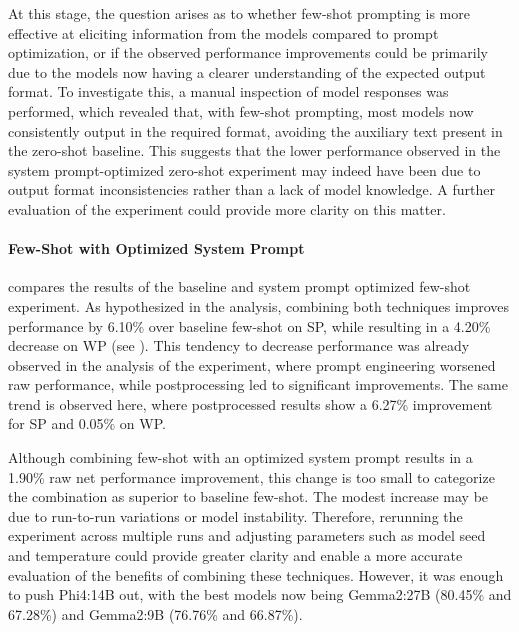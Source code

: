 At this stage, the question arises as to whether few-shot prompting is more effective at eliciting information from the models compared to prompt optimization, or if the observed performance improvements could be primarily due to the models now having a clearer understanding of the expected output format. To investigate this, a manual inspection of model responses was performed, which revealed that, with few-shot prompting, most models now consistently output in the required format, avoiding the auxiliary text present in the zero-shot baseline. This suggests that the lower performance observed in the system prompt-optimized zero-shot experiment may indeed have been due to output format inconsistencies rather than a lack of model knowledge. A further evaluation of the  experiment could provide more clarity on this matter.

\paragraph{Few-Shot with Optimized System Prompt}

 compares the results of the baseline and system prompt optimized few-shot experiment. As hypothesized in the  analysis, combining both techniques improves performance by 6.10\% over baseline few-shot on \ac{SP}, while resulting in a 4.20\% decrease on \ac{WP} (see ). This tendency to decrease performance was already observed in the analysis of the  experiment, where prompt engineering worsened raw performance, while postprocessing led to significant improvements. The same trend is observed here, where postprocessed results show a 6.27\% improvement for \ac{SP} and 0.05\% on \ac{WP}.

Although combining few-shot with an optimized system prompt results in a 1.90\% raw net performance improvement, this change is too small to categorize the combination as superior to baseline few-shot. The modest increase may be due to run-to-run variations or model instability. Therefore, rerunning the experiment across multiple runs and adjusting parameters such as model seed and temperature could provide greater clarity and enable a more accurate evaluation of the benefits of combining these techniques. However, it was enough to push Phi4:14B out, with the best models now being Gemma2:27B (80.45\% and 67.28\%) and Gemma2:9B (76.76\% and 66.87\%).

